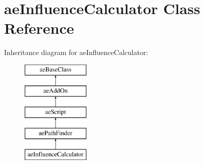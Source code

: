 \hypertarget{classae_influence_calculator}{}\section{ae\+Influence\+Calculator Class Reference}
\label{classae_influence_calculator}
Inheritance diagram for ae\+Influence\+Calculator\+:\begin{figure}[H]
\begin{center}
\leavevmode
\includegraphics[height=5.000000cm]{classae_influence_calculator}
\end{center}
\end{figure}
